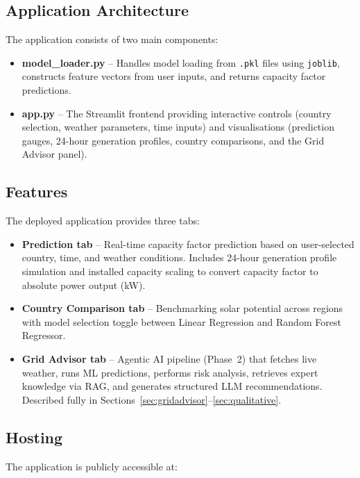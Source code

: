 \documentclass[12pt, a4paper]{article}
\begin{document}
\subsection{Application Architecture}

The application consists of two main components:

\begin{itemize}[noitemsep]
    \item \textbf{model\_loader.py} -- Handles model loading from \texttt{.pkl} files using \texttt{joblib}, constructs feature vectors from user inputs, and returns capacity factor predictions.
    \item \textbf{app.py} -- The Streamlit frontend providing interactive controls (country selection, weather parameters, time inputs) and visualisations (prediction gauges, 24-hour generation profiles, country comparisons, and the Grid Advisor panel).
\end{itemize}

\subsection{Features}

The deployed application provides three tabs:

\begin{itemize}[noitemsep]
    \item \textbf{Prediction tab} -- Real-time capacity factor prediction based on user-selected country, time, and weather conditions. Includes 24-hour generation profile simulation and installed capacity scaling to convert capacity factor to absolute power output (kW).
    \item \textbf{Country Comparison tab} -- Benchmarking solar potential across regions with model selection toggle between Linear Regression and Random Forest Regressor.
    \item \textbf{Grid Advisor tab} -- Agentic AI pipeline (Phase~2) that fetches live weather, runs ML predictions, performs risk analysis, retrieves expert knowledge via RAG, and generates structured LLM recommendations. Described fully in Sections~\ref{sec:gridadvisor}--\ref{sec:qualitative}.
\end{itemize}

\subsection{Hosting}

The application is publicly accessible at:
\end{document}
